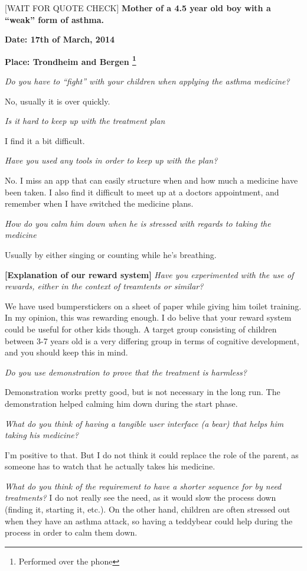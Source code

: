 [WAIT FOR QUOTE CHECK]
\textbf{Mother of a 4.5 year old boy with a ``weak'' form of asthma.}

\textbf{Date: 17th of March, 2014}

\textbf{Place: Trondheim and Bergen \footnote{Performed over the phone}} 

\emph{Do you have to ``fight'' with your children when applying the asthma medicine?}

No, usually it is over quickly.

\emph{Is it hard to keep up with the treatment plan}

I find it a bit difficult. 

\emph{Have you used any tools in order to keep up with the plan?}

No. I miss an app that can easily structure when and how much a medicine have been taken. 
I also find it difficult to meet up at a doctors appointment, and remember when I have switched the medicine plans. 

\emph{How do you calm him down when he is stressed with regards to taking the medicine}

Usually by either singing or counting while he's breathing. 

\textbf{[Explanation of our reward system]}
\emph{Have you experimented with the use of rewards, either in the context of treamtents or similar?}

We have used bumperstickers on a sheet of paper while giving him toilet training. In my opinion, this was rewarding enough. I do belive that your reward system could be useful for other kids though. A target group consisting of children between 3-7 years old is a very differing group in terms of cognitive development, and you should keep this in mind.  

\emph{Do you use demonstration to prove that the treatment is harmless?}

Demonstration works pretty good, but is not necessary in the long run. The demonstration helped calming him down during the start phase. 

\emph{What do you think of having a tangible user interface (a bear) that helps him taking his medicine?}

I'm positive to that. But I do not think it could replace the role of the parent, as someone has to watch that he actually takes his medicine. 

\emph{What do you think of the requirement to have a shorter sequence for by need treatments? }
I do not really see the need, as it would slow the process down (finding it, starting it, etc.). On the other hand, children are often stressed out when they have an asthma attack, so having a teddybear could help during the process in order to calm them down. 

